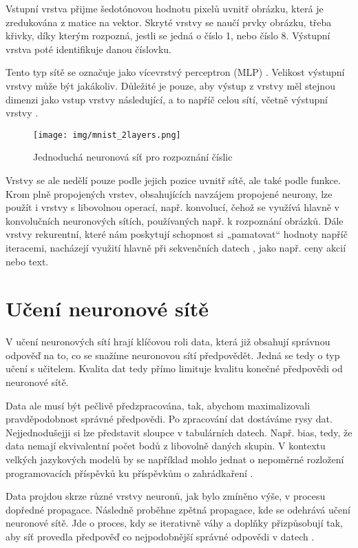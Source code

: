 \documentclass[FM,DP]{tulthesis}
\begin{document}
		Vstupní vrstva přijme šedotónovou hodnotu pixelů uvnitř obrázku, která je zredukována z matice na vektor. Skryté vrstvy se naučí prvky obrázku, třeba křivky, díky kterým rozpozná, jestli se jedná o číslo 1, nebo číslo 8. Výstupní vrstva poté identifikuje danou číslovku. 
		
		Tento typ sítě se označuje jako vícevrstvý perceptron (MLP) \cite{mnist}. Velikost výstupní vrstvy může být jakákoliv. Důležité je pouze, aby výstup z vrstvy měl stejnou dimenzi jako vstup vrstvy následující, a to napříč celou sítí, včetně výstupní vrstvy \cite{mnist}.
		
		\begin{figure}[H]
			\centering
			\texttt{[image: img/mnist\_2layers.png]}
			\caption{Jednoduchá neuronová síť pro rozpoznání číslic \cite{mnist}}
			\label{fig:mnist}
		\end{figure}
		
		Vrstvy se ale nedělí pouze podle jejich pozice uvnitř sítě, ale také podle funkce. Krom plně propojených vrstev, obsahujících navzájem propojené neurony, lze použít i vrstvy s libovolnou operací, např. konvolucí, čehož se využívá hlavně v konvolučních neuronových sítích, používaných např. k rozpoznání obrázků. Dále vrstvy rekurentní, které nám poskytují schopnost si „pamatovat“ hodnoty napříč iteracemi, nacházejí využití hlavně při sekvenčních datech \cite{projectpro} \cite{general}, jako např. ceny akcií nebo text.
		
		\section{Učení neuronové sítě} \label{training}
		V učení neuronových sítí hrají klíčovou roli data, která již obsahují správnou odpověď na to, co se snažíme neuronovou sítí předpovědět. Jedná se tedy o typ učení s učitelem. Kvalita dat tedy přímo limituje kvalitu konečné předpovědi od neuronové sítě. 
		
		Data ale musí být pečlivě předzpracována, tak, abychom maximalizovali pravděpodobnost správné předpovědi. Po zpracování dat dostáváme rysy dat. Nejjednodušejji si lze představit sloupce v tabulárních datech. Např. bias, tedy, že data nemají ekvivalentní počet bodů z libovolně daných skupin. V kontextu velkých jazykových modelů by se například mohlo jednat o nepoměrné rozložení programovacích příspěvků ku příspěvkům o zahrádkaření \cite{rubiks_code}.
		
		Data projdou skrze různé vrstvy neuronů, jak bylo zmíněno výše, v procesu dopředné propagace. Následně proběhne zpětná propagace, kde se odehrává učení neuronové sítě. Jde o proces, kdy se iterativně váhy a doplňky přizpůsobují tak, aby síť provedla předpověď co nejpodobnější správné odpovědi v datech \cite{rubiks_code}.
		
\end{document}
